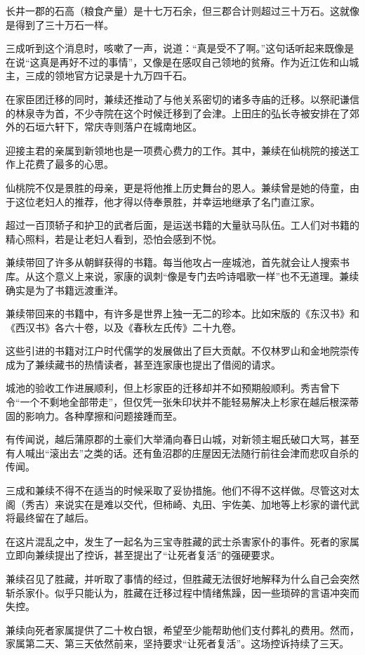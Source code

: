 \documentclass[
]{book}
\begin{document}
长井一郡的石高（粮食产量）是十七万石余，但三郡合计则超过三十万石。这就像是得到了三十万石一样。

三成听到这个消息时，咳嗽了一声，说道：``真是受不了啊。''这句话听起来既像是在说``这真是再好不过的事情''，又像是在感叹自己领地的贫瘠。作为近江佐和山城主，三成的领地官方记录是十九万四千石。

在家臣团迁移的同时，兼续还推动了与他关系密切的诸多寺庙的迁移。以祭祀谦信的林泉寺为首，不少寺院在这个时候迁移到了会津。上田庄的弘长寺被安排在了郊外的石垣六轩下，常庆寺则落户在城南地区。

迎接主君的亲属到新领地也是一项费心费力的工作。其中，兼续在仙桃院的接送工作上花费了最多的心思。

仙桃院不仅是景胜的母亲，更是将他推上历史舞台的恩人。兼续曾是她的侍童，由于这位老妇人的推荐，他才得以侍奉景胜，并幸运地继承了名门直江家。

超过一百顶轿子和护卫的武者后面，是运送书籍的大量驮马队伍。工人们对书籍的精心照料，若是让老妇人看到，恐怕会感到不悦。

兼续带回了许多从朝鲜获得的书籍。每当他攻占一座城池，首先就会让人搜索书库。从这个意义上来说，家康的讽刺``像是专门去吟诗唱歌一样''也不无道理。兼续确实是为了书籍远渡重洋。

兼续带回来的书籍中，有许多是世界上独一无二的珍本。比如宋版的《东汉书》和《西汉书》各六十卷，以及《春秋左氏传》二十九卷。

这些引进的书籍对江户时代儒学的发展做出了巨大贡献。不仅林罗山和金地院崇传成为了兼续藏书的热情读者，甚至连家康也提出了借阅的请求。

城池的验收工作进展顺利，但上杉家臣的迁移却并不如预期般顺利。秀吉曾下令``一个不剩地全部带走''，但仅凭一张朱印状并不能轻易解决上杉家在越后根深蒂固的影响力。各种摩擦和问题接踵而至。

有传闻说，越后蒲原郡的土豪们大举涌向春日山城，对新领主堀氏破口大骂，甚至有人喊出``滚出去''之类的话。还有鱼沼郡的庄屋因无法随行前往会津而悲叹自杀的传闻。

三成和兼续不得不在适当的时候采取了妥协措施。他们不得不这样做。尽管这对太阁（秀吉）来说实在是难以交代，但柿崎、丸田、宇佐美、加地等上杉家的谱代武将最终留在了越后。

在这片混乱之中，发生了一起名为三宝寺胜藏的武士杀害家仆的事件。死者的家属立即向兼续提出了控诉，甚至提出了``让死者复活''的强硬要求。

兼续召见了胜藏，并听取了事情的经过，但胜藏无法很好地解释为什么自己会突然斩杀家仆。似乎只能认为，胜藏在迁移过程中情绪焦躁，因一些琐碎的言语冲突而失控。

兼续向死者家属提供了二十枚白银，希望至少能帮助他们支付葬礼的费用。然而，家属第二天、第三天依然前来，坚持要求``让死者复活''。这场控诉持续了三天。
\end{document}
